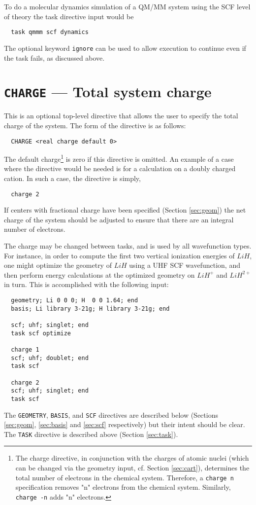 To do a molecular dynamics simulation of a QM/MM system using the SCF
level of theory the task directive input would be
\begin{verbatim}
  task qmmm scf dynamics
\end{verbatim}

The optional keyword \verb+ignore+ can be used to allow execution to
continue even if the task fails, as discussed above.

\section{{\tt CHARGE} --- Total system charge}
\label{sec:charge}

This is an optional top-level directive that allows the user to specify
the total charge of the system.  The form of the directive is as follows:
\begin{verbatim}
  CHARGE <real charge default 0>
\end{verbatim}

The default charge\footnote{The charge directive, in conjunction with
  the charges of atomic nuclei (which can be changed via the geometry
  input, cf. Section \ref{sec:cart}), determines the total number of
  electrons in the chemical system.  Therefore, a {\tt charge n}
  specification removes "n" electrons from the chemical system.
  Similarly, {\tt charge -n} adds "n" electrons.} is zero
if this directive is omitted.  An example of a case where the
directive would be needed is for a calculation on a doubly charged
cation.  In such a case, the directive is simply,
\begin{verbatim}
  charge 2
\end{verbatim}

If centers with fractional charge have been specified (Section
\ref{sec:geom}) the net charge of the system should be adjusted to
ensure that there are an integral number of electrons.

The charge may be changed between tasks, and is used by all
wavefunction types.  For instance, in order to compute the first two
vertical ionization energies of $LiH$, one might optimize the geometry
of $LiH$ using a UHF SCF wavefunction, and then perform energy
calculations at the optimized geometry on $LiH^+$ and
$LiH^{2+}$ in turn.  This is accomplished with the following input:
\begin{verbatim}
  geometry; Li 0 0 0; H  0 0 1.64; end
  basis; Li library 3-21g; H library 3-21g; end

  scf; uhf; singlet; end
  task scf optimize

  charge 1
  scf; uhf; doublet; end
  task scf

  charge 2
  scf; uhf; singlet; end
  task scf
\end{verbatim}
The \verb+GEOMETRY+, \verb+BASIS+, and \verb+SCF+ directives are
described below (Sections \ref{sec:geom}, \ref{sec:basis} and
\ref{sec:scf} respectively) but their intent should be clear.  The
\verb+TASK+ directive is described above (Section \ref{sec:task}).  

